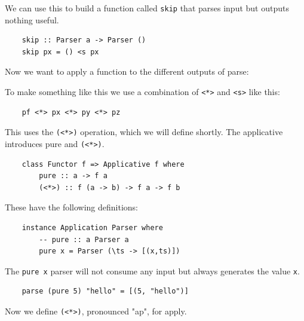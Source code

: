 \documentclass[a4paper,12pt]{article}
\theoremstyle{remark}
\begin{document}
We can use this to build a function called \lstinline{skip} that parses input but outputs
nothing useful.

\begin{lstlisting}
    skip :: Parser a -> Parser ()
    skip px = () <s px  \end{lstlisting}

Now we want to apply a function to the different outputs of parse:

\begin{figure}[H]
  \centering
\end{figure}


To make something like this we use a combination of \lstinline{<*>} and \lstinline{<s>} like this:

\begin{lstlisting}
    pf <*> px <*> py <*> pz  \end{lstlisting}

This uses the \lstinline{(<*>)} operation, which we will define shortly. The applicative
introduces pure and \lstinline{(<*>)}.

\begin{lstlisting}
    class Functor f => Applicative f where
        pure :: a -> f a
        (<*>) :: f (a -> b) -> f a -> f b  \end{lstlisting}

These have the following definitions:

\begin{lstlisting}
    instance Application Parser where
        -- pure :: a Parser a
        pure x = Parser (\ts -> [(x,ts)])  \end{lstlisting}

The \lstinline{pure x} parser will not consume any input but always generates the value \lstinline{x}.

\begin{lstlisting}
    parse (pure 5) "hello" = [(5, "hello")]  \end{lstlisting}

Now we define \lstinline{(<*>)}, pronounced "ap", for apply.
\end{document}
